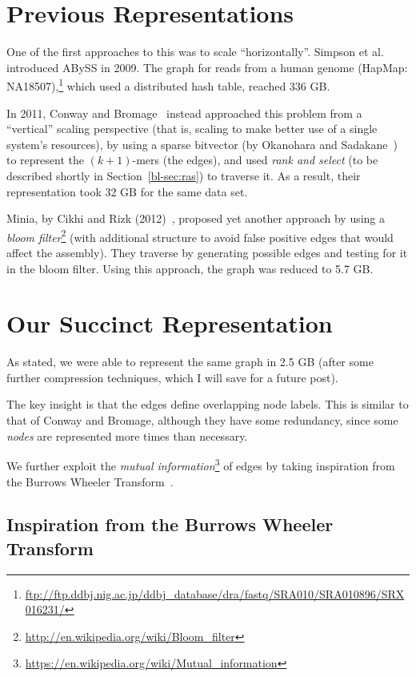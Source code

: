 \section{Previous Representations}\label{bl-sec:pre}

One of the first approaches to this was to scale ``horizontally''. Simpson et al.~\cite{Simpson:2009} introduced ABySS in 2009. The graph for reads from a human genome (HapMap: NA18507),\footnote{\url{ftp://ftp.ddbj.nig.ac.jp/ddbj_database/dra/fastq/SRA010/SRA010896/SRX016231/}} which used a distributed hash table, reached 336 GB.

In 2011, Conway and Bromage~\cite{ConBro11} instead approached this problem from a ``vertical'' scaling perspective (that is, scaling to make better use of a single system's resources), by using a sparse bitvector (by Okanohara and Sadakane~\cite{OkaSad07}) to represent the $(k+1)$-mers (the edges), and used \emph{rank and select} (to be described shortly in Section~\ref{bl-sec:ras}) to traverse it. As a result, their representation took 32 GB for the same data set.

Minia, by Cikhi and Rizk (2012)~\cite{wabi}, proposed yet another approach by using a \emph{bloom filter}\footnote{\url{http://en.wikipedia.org/wiki/Bloom_filter}} (with additional structure to avoid false positive edges that would affect the assembly). They traverse by generating possible edges and testing for it in the bloom filter. Using this approach, the graph was reduced to 5.7 GB.

\section{Our Succinct Representation}\label{bl-sec:our}

As stated, we were able to represent the same graph in 2.5 GB (after some further compression techniques, which I will save for a future post).

The key insight is that the edges define overlapping node labels. This is similar to that of Conway and Bromage, although they have some redundancy, since some \emph{nodes} are represented more times than necessary.

We further exploit the \emph{mutual information}\footnote{\url{https://en.wikipedia.org/wiki/Mutual_information}} of edges by taking inspiration from the Burrows Wheeler Transform~\cite{BurWhe94}.

\subsection{Inspiration from the Burrows Wheeler Transform}\label{bl-sec:bur}

